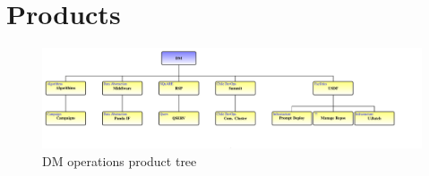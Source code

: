 \section{Products}\label{sec:products}


\begin{figure}
\begin{centering}
\includegraphics[width=1\textwidth]{ProductTreeLand}
\caption{DM operations product tree \label{fig:producttree}}
\end{centering}
\end{figure}


